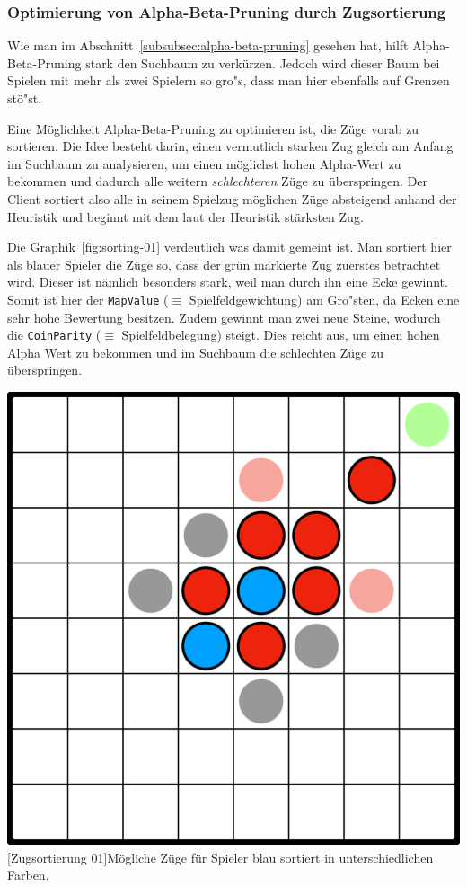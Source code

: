 \newpage

\subsubsection{Optimierung von Alpha-Beta-Pruning durch Zugsortierung}\label{subsubsec:ab-optimierung}
Wie man im Abschnitt~\ref{subsubsec:alpha-beta-pruning} gesehen hat, hilft Alpha-Beta-Pruning stark den Suchbaum zu verk\"urzen.
Jedoch wird dieser Baum bei Spielen mit mehr als zwei Spielern so gro"s, dass man hier ebenfalls auf Grenzen st\"o"st.

Eine M\"oglichkeit Alpha-Beta-Pruning zu optimieren ist, die Z\"uge vorab zu sortieren.
Die Idee besteht darin, einen vermutlich starken Zug gleich am Anfang im Suchbaum zu analysieren, um einen m\"oglichst hohen Alpha-Wert zu bekommen und dadurch alle weitern \textit{schlechteren} Z\"uge zu \"uberspringen.
Der Client sortiert also alle in seinem Spielzug m\"oglichen Z\"uge absteigend anhand der Heuristik und beginnt mit dem laut der Heuristik st\"arksten Zug.

Die Graphik~\ref{fig:sorting-01} verdeutlich was damit gemeint ist.
Man sortiert hier als blauer Spieler die Z\"uge so, dass der gr\"un markierte Zug zuerstes betrachtet wird.
Dieser ist n\"amlich besonders stark, weil man durch ihn eine Ecke gewinnt.
Somit ist hier der \texttt{MapValue} ($\equiv$ Spielfeldgewichtung) am Gr\"o"sten, da Ecken eine sehr hohe Bewertung besitzen.
Zudem gewinnt man zwei neue Steine, wodurch die \texttt{CoinParity} ($\equiv$ Spielfeldbelegung) steigt.
Dies reicht aus, um einen hohen Alpha Wert zu bekommen und im Suchbaum die schlechten Z\"uge zu \"uberspringen.

\vspace{1em}
\begin{minipage}{\linewidth}
    \centering
    \includegraphics[width=0.45\linewidth]{pics/sorting-01}
    [Zugsortierung 01]{M\"ogliche Z\"uge f\"ur Spieler blau sortiert in unterschiedlichen Farben.}
    \label{fig:sorting-01}
\end{minipage}


